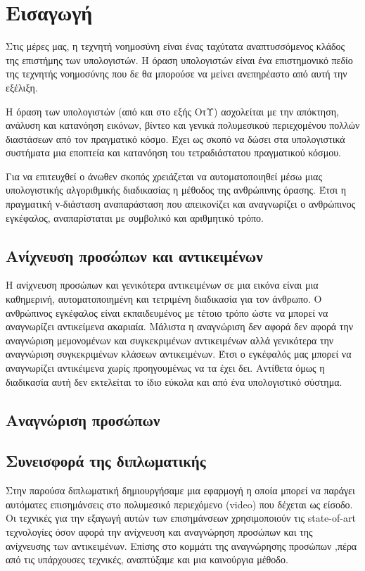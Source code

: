 \chapter{Εισαγωγή}\label{ch:introduction}

Στις μέρες μας, η τεχνητή νοημοσύνη είναι ένας ταχύτατα αναπτυσσόμενος κλάδος
της επιστήμης των υπολογιστών. Η όραση υπολογιστών είναι ένα επιστημονικό πεδίο
της τεχνητής νοημοσύνης που δε θα μπορούσε να μείνει ανεπηρέαστο από αυτή την
εξέλιξη.

Η όραση των υπολογιστών (από και στο εξής ΟτΥ) ασχολείται με την απόκτηση,
ανάλυση και κατανόηση εικόνων, βίντεο και γενικά πολυμεσικού περιεχομένου
πολλών διαστάσεων από τον πραγματικό κόσμο. Έχει ως σκοπό να δώσει στα
υπολογιστικά συστήματα μια εποπτεία και κατανόηση του τετραδιάστατου
πραγματικού κόσμου.

Για να επιτευχθεί ο άνωθεν σκοπός χρειάζεται να αυτοματοποιηθεί μέσω μιας
υπολογιστικής αλγοριθμικής διαδικασίας η μέθοδος της ανθρώπινης όρασης. Έτσι
η πραγματική ν-διάσταση αναπαράσταση που απεικονίζει και αναγνωρίζει ο
ανθρώπινος εγκέφαλος, αναπαρίσταται με συμβολικό και αριθμητικό τρόπο.

\section{Ανίχνευση προσώπων και αντικειμένων}
Η ανίχνευση προσώπων και γενικότερα αντικειμένων σε μια εικόνα είναι μια
καθημερινή, αυτοματοποιημένη και τετριμένη διαδικασία για τον άνθρωπο. Ο ανθρώπινος
εγκέφαλος είναι εκπαιδευμένος με τέτοιο τρόπο ώστε να μπορεί να αναγνωρίζει
αντικείμενα ακαριαία. Μάλιστα η αναγνώριση δεν αφορά δεν αφορά την αναγνώριση
μεμονομένων και συγκεκριμένων αντικειμένων αλλά γενικότερα την αναγνώριση
συγκεκριμένων κλάσεων αντικειμένων. Έτσι ο εγκέφαλός μας μπορεί να αναγνωρίζει
αντικέιμενα χωρίς προηγουμένως να τα έχει δει. Αντίθετα όμως η διαδικασία αυτή
δεν εκτελείται το ίδιο εύκολα και από ένα υπολογιστικό σύστημα.


\section{Αναγνώριση προσώπων}

\section{Συνεισφορά της διπλωματικής}

Στην παρούσα διπλωματική δημιουργήσαμε μια εφαρμογή η οποία μπορεί να παράγει
αυτόματες επισημάνσεις στο πολυμεσικό περιεχόμενο (video) που δέχεται ως
είσοδο. Οι τεχνικές για την εξαγωγή αυτών των επισημάνσεων χρησιμοποιούν
τις state-of-art τεχνολογίες όσον αφορά την ανίχνευση και αναγνώρηση προσώπων
και της ανίχνευσης των αντικειμένων. Επίσης στο κομμάτι της αναγνώρησης προσώπων
,πέρα από τις υπάρχουσες τεχνικές, αναπτύξαμε και μια καινούργια μέθοδο.

